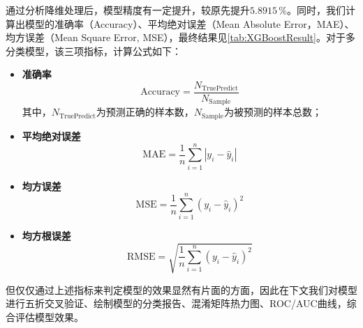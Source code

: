 \documentclass{MathorCupModeling}
\begin{document}
	通过分析降维处理后，模型精度有一定提升，较原先提升$5.8915\,\%$。同时，我们计算出模型的准确率（Accuracy）、平均绝对误差（Mean Absolute Error，MAE）、均方误差（Mean Square Error, MSE），最终结果见\textcolor{blue}{\cref{tab:XGBoostResult}}。对于多分类模型，该三项指标，计算公式如下：
\begin{itemize}
	\item \textbf{准确率}
		\begin{equation}
		\mathrm{Accuracy}=\frac{N_{\mathrm{TruePredict}}}{N_{\mathrm{Sample}}} \label{Accuracy}
		\end{equation}
	其中，$N_{\mathrm{TruePredict}}$为预测正确的样本数，$N_{\mathrm{Sample}}$为被预测的样本总数；
	\item \textbf{平均绝对误差}
		\begin{equation}
		\mathrm{MAE}=\frac{1}{n}\sum_{i=1}^{n}\left|y_{i}-\hat{y}_{i}\right| \label{MAE}
		\end{equation}
	\item \textbf{均方误差}
		\begin{equation}
		\mathrm{MSE}=\frac{1}{n}\sum_{i=1}^{n}\left(y_{i}-\hat{y}_{i}\right)^{2} \label{MSE}
		\end{equation}
	\item \textbf{均方根误差}
		\begin{equation}
		\mathrm{RMSE}=\sqrt{\frac{1}{n}\sum_{i=1}^{n}\left(y_{i}-\hat{y}_{i}\right)^{2}} \label{RMSE}
		\end{equation}
\end{itemize}

\begin{table}[H]
	\centering
	\caption{XGBoost模型最终效果}
	\label{tab:XGBoostResult}
\end{table}

但仅仅通过上述指标来判定模型的效果显然有片面的方面，因此在下文我们对模型进行五折交叉验证、绘制模型的分类报告、混淆矩阵热力图、ROC/AUC曲线，综合评估模型效果。
\end{document}
